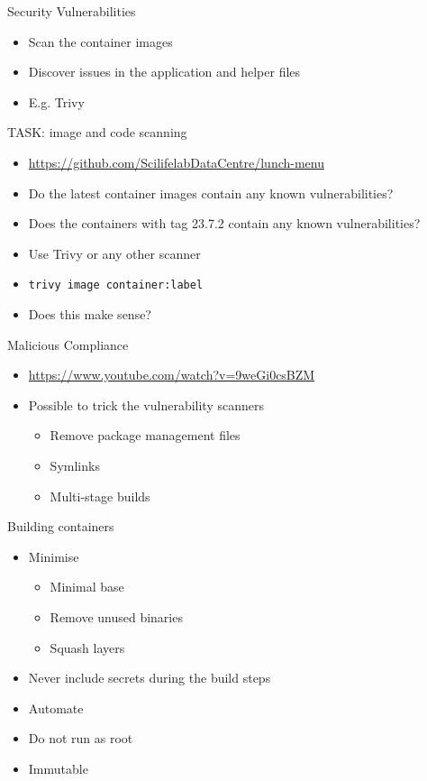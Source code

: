 \documentclass{dcpresentation}
\begin{document}
\begin{frame}{Security Vulnerabilities}
  \begin{itemize}
  \item Scan the container images
  \item Discover issues in the application and helper files
  \item E.g. Trivy
  \end{itemize}
\end{frame}


\begin{frame}{TASK: image and code scanning}
  \begin{itemize}
  \item \url{https://github.com/ScilifelabDataCentre/lunch-menu}
  \item Do the latest container images contain any known vulnerabilities?
  \item Does the containers with tag 23.7.2 contain any known vulnerabilities?
  \item Use Trivy or any other scanner
  \item \texttt{trivy image container:label}
  \item Does this make sense?
  \end{itemize}
\end{frame}


\begin{frame}{Malicious Compliance}
  \begin{itemize}
  \item \url{https://www.youtube.com/watch?v=9weGi0csBZM}
  \item Possible to trick the vulnerability scanners
  \begin{itemize}
  \item Remove package management files
  \item Symlinks
  \item Multi-stage builds
  \end{itemize} 
  \end{itemize}  
\end{frame}


\begin{frame}{Building containers}
 \begin{itemize}
  \item Minimise
  \begin{itemize}
   \item Minimal base %
   \item Remove unused binaries
   \item Squash layers %
  \end{itemize}
  \item Never include secrets during the build steps
  \item Automate
  \item Do not run as root
  \item Immutable
 \end{itemize}
\end{frame}
\end{document}
